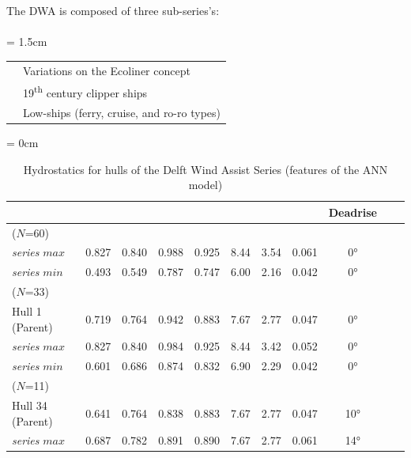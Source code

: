 \documentclass[twoside,twocolumn]{article}
\begin{document}
The DWA is composed of three sub-series's: \\
\\ 
\leftskip = 1.5cm
\begin{tabular}[!th]{p{1.5cm}p{4cm}}
	\firstseries & Variations on the Ecoliner concept \cite{Ecoliner} \\
	\secondseries &  19\textsuperscript{th} century clipper ships \\ 
	\thirdseries & Low-\Cp \space ships (ferry, cruise, and ro-ro types) \\ 
\end{tabular}
\leftskip = 0cm

\begin{table}[b]
	\centering
	\caption{Hydrostatics for hulls of the Delft Wind Assist Series (features of the ANN model)}
	\begin{tabular}{p{2.8cm}*{10}{S}}
		\toprule
		& {\Cb} & {\Cp} & {\Cm} & {\Cwp} & {\LB} & {\BT} & {\TL}  & {Deadrise}         \\\midrule
		\DWA ($N$=60)            &       &       &       &        &       &       &         &                    \\ \midrule
		\textit{series} $max$ & 0.827 & 0.840 & 0.988 & 0.925  & 8.44  & 3.54  & 0.061   & \ang{0}                  \\
		\textit{series} $min$ & 0.493 & 0.549 & 0.787 & 0.747  & 6.00  & 2.16  & 0.042   & \ang{0}        { \bigskip} \\
		\firstseries ($N$=33)            &       &       &       &        &       &       &         &                    \\ \midrule
		Hull 1 (Parent)                & 0.719 & 0.764 & 0.942 & 0.883  & 7.67  & 2.77  & 0.047   & \ang{0}                  \\
		\textit{series} $max$     & 0.827 & 0.840 & 0.984 & 0.925  & 8.44  & 3.42  & 0.052   & \ang{0}                  \\
		\textit{series} $min$     & 0.601 & 0.686 & 0.874 & 0.832  & 6.90  & 2.29  & 0.042   & \ang{0}        { \bigskip} \\
		\secondseries ($N$=11)            &       &       &       &        &       &       &         &                    \\ \midrule
		Hull 34 (Parent)               & 0.641 & 0.764 & 0.838 & 0.883  & 7.67  & 2.77  & 0.047   & \ang{10}                 \\
		\textit{series} $max$     & 0.687 & 0.782 & 0.891 & 0.890  & 7.67  & 2.77  & 0.061   & \ang{14}                 \\

\end{tabular}
\end{table}
\end{document}
